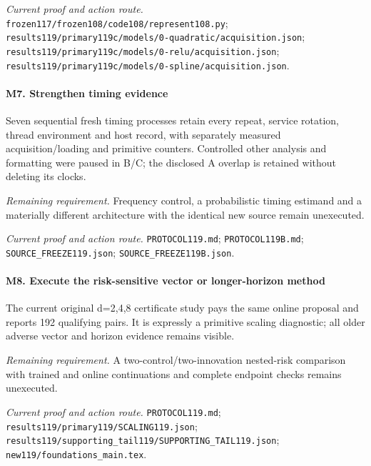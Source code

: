 \par\emph{Current proof and action route.} \nolinkurl{frozen117/frozen108/code108/represent108.py}; \nolinkurl{results119/primary119c/models/0-quadratic/acquisition.json}; \nolinkurl{results119/primary119c/models/0-relu/acquisition.json}; \nolinkurl{results119/primary119c/models/0-spline/acquisition.json}.

\paragraph{M7. Strengthen timing evidence}

Seven sequential fresh timing processes retain every repeat, service rotation, thread environment and host record, with separately measured acquisition/\allowbreak{}loading and primitive counters. Controlled other analysis and formatting were paused in B/\allowbreak{}C; the disclosed A overlap is retained without deleting its clocks.

\par\emph{Remaining requirement.} Frequency control, a probabilistic timing estimand and a materially different architecture with the identical new source remain unexecuted.

\par\emph{Current proof and action route.} \nolinkurl{PROTOCOL119.md}; \nolinkurl{PROTOCOL119B.md}; \nolinkurl{SOURCE_FREEZE119.json}; \nolinkurl{SOURCE_FREEZE119B.json}.

\paragraph{M8. Execute the risk-sensitive vector or longer-horizon method}

The current original d=2,4,8 certificate study pays the same online proposal and reports 192 qualifying pairs. It is expressly a primitive scaling diagnostic; all older adverse vector and horizon evidence remains visible.

\par\emph{Remaining requirement.} A two-control/\allowbreak{}two-innovation nested-risk comparison with trained and online continuations and complete endpoint checks remains unexecuted.

\par\emph{Current proof and action route.} \nolinkurl{PROTOCOL119.md}; \nolinkurl{results119/primary119/SCALING119.json}; \nolinkurl{results119/supporting_tail119/SUPPORTING_TAIL119.json}; \nolinkurl{new119/foundations_main.tex}.

